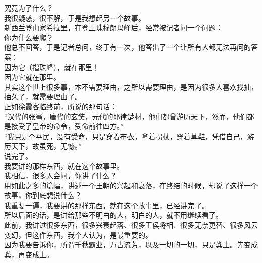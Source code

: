 \begin{multicols}{\theparacolNo}
究竟为了什么？\\

我很疑惑，很不解，于是我想起另一个故事。\\

新西兰登山家希拉里，在登上珠穆朗玛峰后，经常被记者问一个问题：\\

你为什么要爬？\\

他总不回答，于是记者总问，终于有一次，他答出了一个让所有人都无法再问的答案：\\

因为它（指珠峰），就在那里！\\

因为它就在那里。\\

其实这个世上很多事，本不需要理由，之所以需要理由，是因为很多人喜欢找抽，抽久了，就需要理由了。\\

正如徐霞客临终前，所说的那句话：\\

“汉代的张骞，唐代的玄奘，元代的耶律楚材，他们都曾游历天下，然而，他们都是接受了皇帝的命令，受命前往四方。”\\

“我只是个平民，没有受命，只是穿着布衣，拿着拐杖，穿着草鞋，凭借自己，游历天下，故虽死，无憾。”\\

说完了。\\

我要讲的那样东西，就在这个故事里。\\

我相信，很多人会问，你讲了什么？\\

用如此之多的篇幅，讲述一个王朝的兴起和衰落，在终结的时候，却说了这样一个故事，你到底想说什么？\\

我重复一遍，我要讲的那样东西，就在这个故事里，已经讲完了。\\

所以后面的话，是讲给那些不明白的人，明白的人，就不用继续看了。\\

此前，我讲过很多东西，很多兴衰起落、很多王侯将相、很多无奈更替、很多风云变幻，但这件东西，我个人认为，是最重要的。\\

因为我要告诉你，所谓千秋霸业，万古流芳，以及一切的一切，只是粪土。先变成粪，再变成土。\\


\end{multicols}
